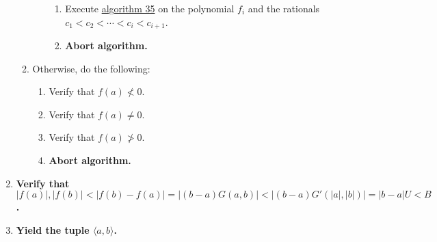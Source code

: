 \documentclass[twocolumn]{article}
\begin{document}
\begin{enumerate}
\begin{enumerate}
\begin{enumerate}
\begin{enumerate}
							\item Execute \hyperref[sec:algorithm 35]{algorithm 35} on the polynomial $f_i$ and the rationals $c_1<c_2<\cdots<c_i<c_{i+1}$.
							\item \textbf{Abort algorithm.}
						\end{enumerate}
					\end{enumerate}
					\item Otherwise, do the following:
					\begin{enumerate}
						\item Verify that $f(a)\nless 0$.
						\item Verify that $f(a)\ne 0$.
						\item Verify that $f(a)\ngtr 0$.
						\item \textbf{Abort algorithm.}
					\end{enumerate}
				\end{enumerate}
				\item \textbf{Verify that $\lvert f(a)\rvert,\lvert f(b)\rvert<\lvert f(b)-f(a)\rvert=\lvert(b-a)G(a,b)\rvert<\lvert(b-a)G'(\lvert a\rvert,\lvert b\rvert)\rvert=\lvert b-a\rvert U<B$.}
				\item \textbf{Yield the tuple $\langle a,b\rangle$.}
			\end{enumerate}
\end{document}
